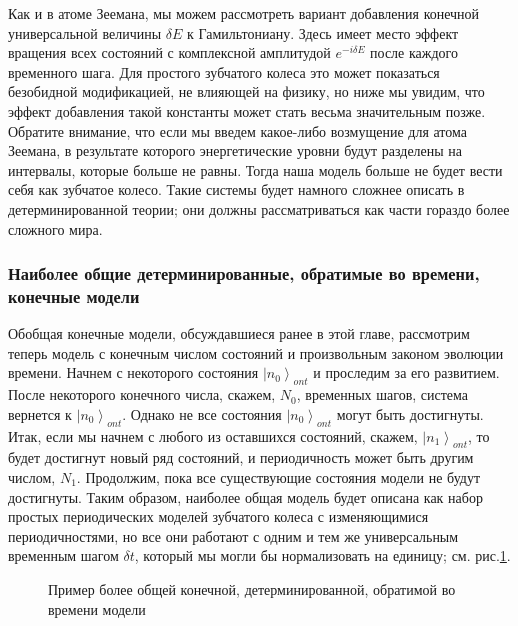 \documentclass[main.tex]{subfiles}
\begin{document}
Как и в атоме Зеемана, мы можем рассмотреть вариант добавления конечной универсальной величины $\delta E$ к Гамильтониану. Здесь имеет место эффект вращения всех состояний с комплексной амплитудой $e^{-i \delta E}$ после каждого временного шага. Для простого зубчатого колеса это может показаться безобидной модификацией, не влияющей на физику, но ниже мы увидим, что эффект добавления такой константы может стать весьма значительным позже.
Обратите внимание, что если мы введем какое-либо возмущение для атома Зеемана, в результате которого энергетические уровни будут разделены на интервалы, которые больше не равны. Тогда наша модель больше не будет вести себя как зубчатое колесо. Такие системы будет намного сложнее описать в детерминированной теории; они должны рассматриваться как части гораздо более сложного мира.

\subsubsection{Наиболее общие детерминированные, обратимые во времени, конечные модели}\label{ch2.2.2}

Обобщая конечные модели, обсуждавшиеся ранее в этой главе, рассмотрим теперь модель с конечным числом состояний и произвольным законом эволюции времени. Начнем с некоторого состояния $\left|n_0\right>_{ont}$ и проследим за его развитием. После некоторого конечного числа, скажем, $N_0$, временных шагов, система вернется к $\left|n_0\right>_{ont}$. Однако не все состояния $\left|n_0\right>_{ont}$ могут быть достигнуты. Итак, если мы начнем с любого из оставшихся состояний, скажем, $\left|n_1\right>_{ont}$, то будет достигнут новый ряд состояний, и периодичность может быть другим числом, $N_1$. Продолжим, пока все существующие состояния модели не будут достигнуты. Таким образом, наиболее общая модель будет описана как набор простых периодических моделей зубчатого колеса с изменяющимися периодичностями, но все они работают с одним и тем же универсальным временным шагом $\delta t$, который мы могли бы нормализовать на единицу; см. рис.\ref{i2.2}.




\begin{figure}[ht] %
	\begin{center}
		\caption{
		\label{i2.2} Пример более общей конечной, детерминированной, обратимой во времени модели}
	\end {center}
\end {figure}
\end{document}
